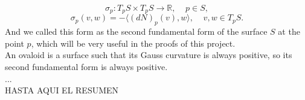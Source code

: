 $$ \sigma_p : T_pS \times T_pS \to \mathbb{R}, \;\;\;\; p \in S, $$
$$ \sigma_p(v,w) = - \langle (dN)_p(v), w \rangle, \;\;\;\; v,w \in T_pS. $$
And we called this form as the second fundamental form of the surface $S$ at the point $p$, which will be very useful in the proofs of this project.
${ }$\\

An ovaloid is a surface such that its Gauss curvature is always positive, so its second fundamental form is always positive.
${ }$\\

...
${ }$\\

HASTA AQUI EL RESUMEN
${ }$\\




















